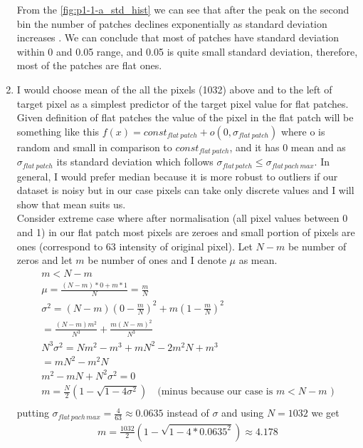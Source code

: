 \documentclass{article}
\begin{document}
\begin{enumerate}[label=(\alph*)]
				 	From the \ref{fig:p1-1-a_std_hist} we can see that after the peak on the second bin the number of patches declines exponentially as  standard deviation increases . We can conclude that most of patches have standard deviation within 0 and 0.05 range, and 0.05 is quite small standard deviation, therefore, most of the patches are flat ones. 
				\item
					I would choose mean of the all the pixels (1032) above and to the left of target pixel as a simplest predictor of the target pixel value for flat patches. Given definition of flat patches the value of the pixel in the flat patch will be something like this $f(x) = const_{flat\ patch} + o(0, \sigma_{flat\ patch})$ where o is random and small in comparison to $const_{flat\ patch}$, and it has 0 mean and as $\sigma_{flat\ patch}$ its standard deviation which follows $\sigma_{flat \, patch} \leq \sigma_{flat \, pach \, max}$. In general, I would prefer median because it is more robust to outliers if our dataset is noisy but in our case pixels can take only discrete values and I will show that mean suits us.\\
					Consider extreme case where after normalisation (all pixel values between 0 and 1) in our flat patch  most pixels are zeroes and small portion of pixels are ones (correspond to 63 intensity of original pixel). Let $N-m$ be number of zeros and let $m$ be number of ones and I denote $\mu$ as mean. 
					\begin{gather*}
						m < N - m\\
						\mu = \frac{(N - m) * 0 + m * 1}{N} = \frac{m}{N}\\
						\sigma^2 = (N - m) (0 - \frac{m}{N})^2 + m(1 - \frac{m}{N})^2 \\
						= \frac{(N - m)m^2}{N^3} + \frac{m(N - m)^2}{N ^ 3}\\
						N^3\sigma^2 = Nm^2 - m^3 + mN^2 - 2m^2N + m^3 \\
						= mN^2-m^2N\\
						m^2 - mN + N^2\sigma^2 = 0\\
						m = \frac{N}{2}(1 - \sqrt{1 - 4 \sigma ^ 2})\quad\text{(minus because our case is $m < N - m$ )}\\
					\end{gather*}
					putting $\sigma_{flat \, pach \, max} = \frac{4}{63} \approx 0.0635$ instead of $\sigma$ and using $N = 1032$ we get
					\begin{gather*}
						m = \frac{1032}{2}(1 - \sqrt{1 - 4 * 0.0635^2}) \approx 4.178
					\end{gather*}

\end{enumerate}
\end{document}
